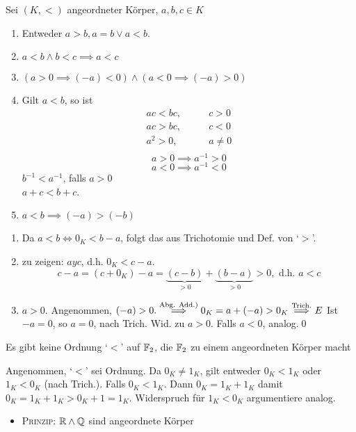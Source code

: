 \documentclass[consecutivenumbering]{gadsescript}
\begin{document}
\begin{sublemma}
	Sei $ ( K, < ) $ angeordneter Körper, $ a, b, c \in K $
	\begin{enumerate}[label=(\roman*)]
		\item Entweder $ a > b, a = b \vee a < b $.
		\item $ a < b \wedge b < c \implies a < c $
		\item $ ( a > 0 \implies (-a) < 0) \wedge ( a < 0 \implies (-a) > 0) $
		\item Gilt $ a < b $, so ist
			\begin{align*}
				ac < bc, & \qquad c>0\\
				ac > bc, & \qquad c < 0\\
				a^2 > 0, & \qquad a \neq 0\\
			\end{align*}
			\[ a > 0 \implies a^{-1} > 0 \]
			\[ a < 0 \implies a^{-1} < 0 \]
			$ b^{-1} < a^{-1} $, falls $ a > 0 $\\
			$ a + c < b + c $.
		\item $ a < b \implies (-a) > (-b) $
	\end{enumerate}
	\begin{subproof*}[(i)-(iii)]
		\begin{enumerate}[label=(\roman*)]
			\item Da $ a < b \iff 0_K < b - a $, folgt das aus Trichotomie und Def. von `$>$'.
			\item zu zeigen: $ a y c $, d.h. $ 0_K < c-a$.
				\[ c - a = ( c + 0_K ) - a = \underbrace{(c-b)}_{>0} + \underbrace{(b-a)}_{>0} > 0, \text{ d.h. } a < c \]
			\item $ a > 0 $. Angenommen, $ (-a ) > 0. \overset{\text{Abg. Add.)}}{\implies} 0_K = a + (-a) > 0_K \overset{\text{Trich.}}{\implies} \Lightning $ Ist $-a = 0$, so $ a = 0 $, nach Trich. Wid. zu $ a > 0 $. Falls $ a < 0 $, analog.\qed
		\end{enumerate}
	\end{subproof*}
\end{sublemma}
\begin{subcorollary}
	Es gibt keine Ordnung `$<$' auf $\mathbb{F}_2$, die $\mathbb{F}_2$ zu einem angeordneten Körper macht
	\begin{proof*}
		Angenommen, `$<$' sei Ordnung. Da $ 0_K \neq 1_K $, gilt entweder $ 0_K < 1_K $ oder $ 1_K < 0_K $ (nach Trich.). Falls $ 0_K < 1_K $. Dann $ 0_K = 1_K + 1_K $ damit $ 0_K = 1_K + 1_K > 0_K + 1 = 1_K $. Widerspruch für $1_K < 0_K$ argumentiere analog.
	\end{proof*}
\end{subcorollary}
\begin{itemize}
	\item \textsc{Prinzip:} $\mathbb{R} \wedge \mathbb{Q} $ sind angeordnete Körper
\end{itemize}
\end{document}
